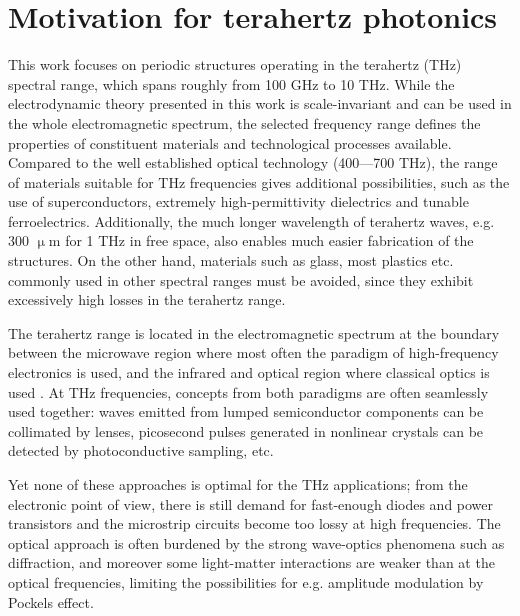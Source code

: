 \section{Motivation for terahertz photonics}
This work focuses on periodic structures operating in the terahertz (THz) spectral range, which spans roughly from 100 GHz to 10 THz. While the electrodynamic theory presented in this work is scale-invariant and can be used in the whole electromagnetic spectrum, the selected frequency range defines the properties of constituent materials and technological processes available. Compared to the well established optical technology (400---700 THz), the range of materials suitable for THz frequencies gives additional possibilities, such as the use of superconductors, extremely high-permittivity dielectrics and tunable ferroelectrics. Additionally, the much longer wavelength of terahertz waves, e.g. 300 $\upmu$m for 1 THz in free space, also enables much easier fabrication of the structures. On the other hand, materials such as glass, most plastics etc. commonly used in other spectral ranges must be avoided, since they exhibit excessively high losses in the terahertz range.

The terahertz range is located in the electromagnetic spectrum at the boundary between the microwave region where most often the paradigm of high-frequency electronics is used, and the infrared and optical region where classical optics is used \cite{ozyuzer2007emission}. At THz frequencies, concepts from both paradigms are often seamlessly used together: waves emitted from lumped semiconductor components can be collimated by lenses, picosecond pulses generated in nonlinear crystals can be detected by photoconductive sampling, etc. 

Yet none of these approaches is optimal for the THz applications; from the electronic point of view, there is still demand for fast-enough diodes and power transistors and the microstrip circuits become too lossy at high frequencies. The optical approach is often burdened by the strong wave-optics phenomena such as diffraction, and moreover some light-matter interactions are weaker than at the optical frequencies, limiting the possibilities for e.g. amplitude modulation by Pockels effect. 

